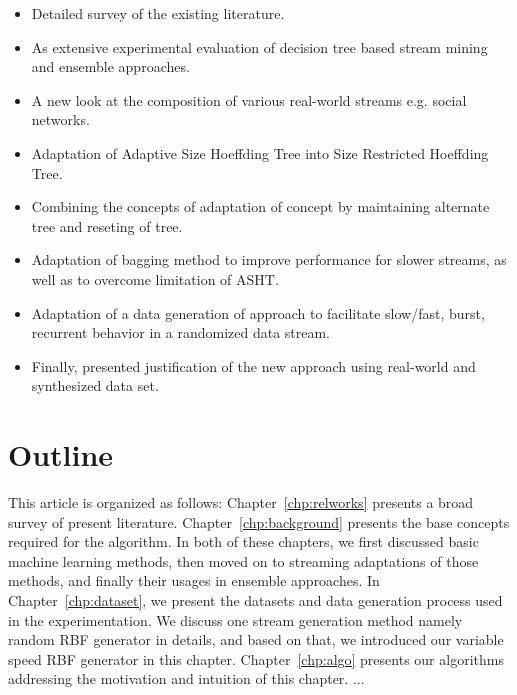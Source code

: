 \begin{itemize}
    \item Detailed survey of the existing literature.
    \item As extensive experimental evaluation of decision tree based stream mining and ensemble approaches.
    \item A new look at the composition of various real-world streams e.g. social networks.
    \item Adaptation of Adaptive Size Hoeffding Tree into Size Restricted Hoeffding Tree.
    \item Combining the concepts of adaptation of concept by maintaining alternate tree and reseting of tree.
    \item Adaptation of bagging method to improve performance for slower streams, as well as to overcome limitation of ASHT.
    \item Adaptation of a data generation of approach to facilitate slow/fast, burst, recurrent behavior in a randomized data stream.
    \item Finally, presented justification of the new approach using real-world and synthesized data set.
\end{itemize}


\section{Outline}
This article is organized as follows: Chapter~\ref{chp:relworks} presents a broad survey of present literature. Chapter~\ref{chp:background} presents the base concepts required for the algorithm. In both of these chapters, we first discussed basic machine learning methods, then moved on to streaming adaptations of those methods, and finally their usages in ensemble approaches. In Chapter~\ref{chp:dataset}, we present the datasets and data generation process used in the experimentation. We discuss one stream generation method namely random RBF generator in details, and based on that, we introduced our variable speed RBF generator in this chapter. Chapter~\ref{chp:algo} presents our algorithms addressing the motivation and intuition of this chapter. ...
